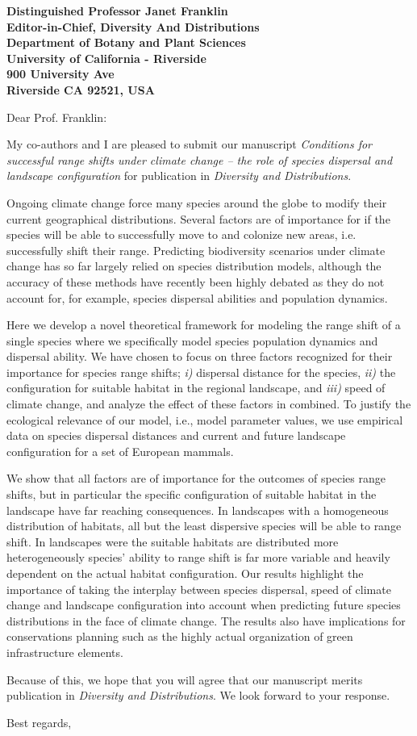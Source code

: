 \documentclass[12pt]{letter}
\newcommand{\mytitle}{\emph{Conditions for successful range shifts under climate change -- the role of species dispersal and landscape configuration }}
\newcommand{\myjournal}{\emph{Diversity and Distributions}}
\begin{document}
\begin{letter}{\bf Distinguished  Professor Janet Franklin\\
               Editor-in-Chief, Diversity And Distributions\\
               Department of Botany and Plant Sciences\\
               University of California - Riverside\\
               900 University Ave\\
               Riverside CA 92521, USA
                               }


\opening{Dear Prof. Franklin:}
My co-authors and I are pleased to submit our manuscript \mytitle for publication in \myjournal. 
    
Ongoing climate change force many species around the globe to modify their current geographical distributions. Several factors are of importance for if the species will be able to successfully move to and colonize new areas, i.e. successfully shift their range. Predicting biodiversity scenarios under climate change has so far largely relied on species distribution models, although the accuracy of these methods have recently been highly debated as they do not account for, for example, species dispersal abilities and population dynamics. 

Here we develop a novel theoretical framework for modeling the range shift of a single species where we specifically model species population dynamics and dispersal ability. We have chosen to focus on three factors recognized for their importance for species range shifts; {\em i)} dispersal distance for the species, {\em ii)}  the configuration for suitable habitat in the regional landscape, and {\em iii)} speed of climate change, and analyze the effect of these factors in combined. To justify the ecological relevance of our model, i.e., model parameter values, we use empirical data on species dispersal distances and current and future landscape configuration for a set of European mammals. 

We show that all factors are of importance for the outcomes of species range shifts, but in particular the specific configuration of suitable habitat in the landscape have far reaching consequences. In landscapes with a homogeneous distribution of habitats, all but the least 
dispersive species will be able to range shift. In landscapes were the suitable habitats are distributed more heterogeneously species’ ability to range shift is far more variable and heavily dependent on the actual habitat configuration. Our results highlight the importance of taking the interplay between species dispersal, speed of climate change and landscape configuration into account when predicting future species distributions in the face of climate change. The results also have implications for conservations planning such as the highly actual organization of green infrastructure elements.

    Because of this, we hope that you will agree that our manuscript merits 
    publication in \myjournal.  We look forward to your response.


\closing{Best regards,}


\end{letter}
\end{document}
